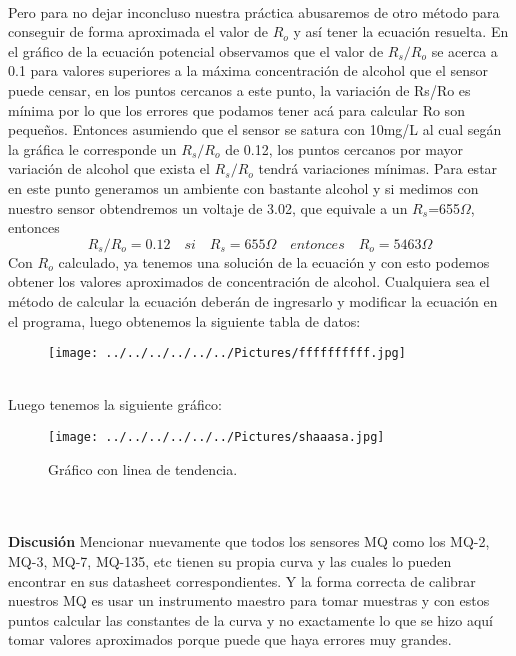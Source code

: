 \documentclass[11pt,a4paper]{article}
\begin{document}
\\
Pero para no dejar inconcluso nuestra pr\'{a}ctica abusaremos de otro m\'{e}todo para conseguir de forma aproximada el valor de ${R}_{o}$ y as\'{i} tener la ecuaci\'{o}n resuelta. En el gr\'{a}fico de la ecuaci\'{o}n potencial observamos que el valor de ${R}_{s}/{R}_{o}$ se acerca a 0.1 para valores superiores a la  m\'{a}xima concentraci\'{o}n de alcohol que el sensor puede censar, en los puntos cercanos a este punto, la variaci\'{o}n de Rs/Ro es m\'{i}nima por lo que los errores que podamos tener ac\'{a} para calcular Ro son peque\~{n}os. Entonces asumiendo que el sensor se satura con 10mg/L  al cual seg\'{a}n la gr\'{a}fica le corresponde un  ${R}_{s}/{R}_{o}$  de 0.12, los puntos cercanos por mayor variaci\'{o}n de alcohol que exista el ${R}_{s}/{R}_{o}$ tendr\'{a} variaciones m\'{i}nimas. Para estar en este punto generamos un ambiente con bastante alcohol y si medimos con nuestro sensor obtendremos un voltaje de 3.02, que equivale a un ${R}_{s}$=655$\Omega$, entonces
\[{R}_{s}/{R}_{o}=0.12 \quad si \quad {R}_{s}= 655 \Omega \quad entonces \quad {R}_{o}= 5463 \Omega \]
Con ${R}_{o}$ calculado,  ya tenemos una soluci\'{o}n de la ecuaci\'{o}n y con esto  podemos obtener los valores aproximados de concentraci\'{o}n de alcohol. Cualquiera sea el m\'{e}todo de calcular la ecuaci\'{o}n deber\'{a}n de ingresarlo y modificar la ecuaci\'{o}n en  el programa, luego obtenemos la siguiente tabla de datos: 
\begin{figure}[hbtp]
\centering
\texttt{[image: ../../../../../../Pictures/ffffffffff.jpg]} 
\end{figure}
\\
Luego tenemos la siguiente gr\'{a}fico: 
\begin{figure}[hbtp]
\centering
\texttt{[image: ../../../../../../Pictures/shaaasa.jpg]}
\caption{Gr\'{a}fico con linea de tendencia.}
\end{figure}
\\
\\
\textbf{Discusi\'{o}n}
Mencionar nuevamente que todos los sensores MQ como los MQ-2, MQ-3, MQ-7, MQ-135, etc tienen su propia curva y las cuales lo pueden encontrar en sus datasheet correspondientes. Y la forma correcta de calibrar nuestros MQ es usar un instrumento maestro para tomar muestras y con estos puntos calcular las constantes de la curva y no exactamente lo que se hizo aqu\'{i} tomar valores aproximados porque puede que haya errores muy grandes. 
\end{document}
